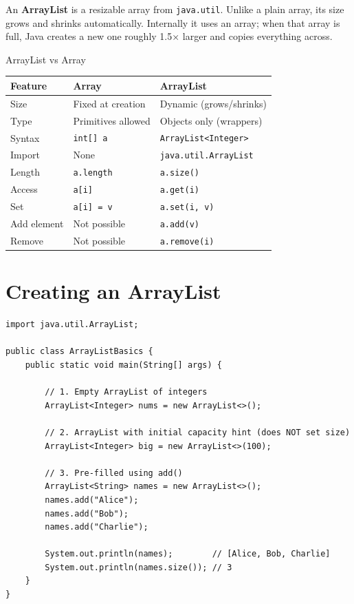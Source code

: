 \documentclass[12pt,a4paper,oneside]{book}
\begin{document}
An \textbf{ArrayList} is a resizable array from \texttt{java.util}. Unlike a plain array, its size grows and shrinks automatically. Internally it uses an array; when that array is full, Java creates a new one roughly 1.5× larger and copies everything across.

\begin{definitionbox}{ArrayList vs Array}
\begin{center}
\begin{tabular}{p{3.5cm}p{3.8cm}p{4.5cm}}
\toprule
\textbf{Feature} & \textbf{Array} & \textbf{ArrayList}\\
\midrule
Size        & Fixed at creation     & Dynamic (grows/shrinks)\\
Type        & Primitives allowed    & Objects only (wrappers)\\
Syntax      & \texttt{int[] a}      & \texttt{ArrayList<Integer>}\\
Import      & None                  & \texttt{java.util.ArrayList}\\
Length      & \texttt{a.length}     & \texttt{a.size()}\\
Access      & \texttt{a[i]}         & \texttt{a.get(i)}\\
Set         & \texttt{a[i] = v}     & \texttt{a.set(i, v)}\\
Add element & Not possible          & \texttt{a.add(v)}\\
Remove      & Not possible          & \texttt{a.remove(i)}\\
\bottomrule
\end{tabular}
\end{center}
\end{definitionbox}

\section{Creating an ArrayList}

\begin{lstlisting}[caption={ArrayList --- Declaration and Initialisation}]
import java.util.ArrayList;

public class ArrayListBasics {
    public static void main(String[] args) {

        // 1. Empty ArrayList of integers
        ArrayList<Integer> nums = new ArrayList<>();

        // 2. ArrayList with initial capacity hint (does NOT set size)
        ArrayList<Integer> big = new ArrayList<>(100);

        // 3. Pre-filled using add()
        ArrayList<String> names = new ArrayList<>();
        names.add("Alice");
        names.add("Bob");
        names.add("Charlie");

        System.out.println(names);        // [Alice, Bob, Charlie]
        System.out.println(names.size()); // 3
    }
}
\end{lstlisting}
\end{document}

